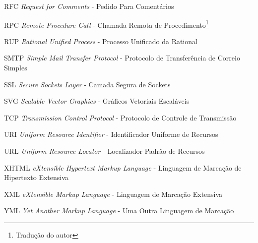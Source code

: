 \begin{siglas}
	\item[RFC] \textit{Request for Comments} - Pedido Para Comentários
	\item[RPC] \textit{Remote Procedure Call} - Chamada Remota de Procedimento\footnote{Tradução do autor}
	\item[RUP] \textit{Rational Unified Process} - Processo Unificado da Rational
	\item[SMTP] \textit{Simple Mail Transfer Protocol} - Protocolo de Transferência de Correio Simples
	\item[SSL] \textit{Secure Sockets Layer} - Camada Segura de Sockets
	\item[SVG] \textit{Scalable Vector Graphics} - Gráficos Vetoriais Escaláveis
	\item[TCP] \textit{Transmission Control Protocol} - Protocolo de Controle de Transmissão
	\item[URI] \textit{Uniform Resource Identifier} - Identificador Uniforme de Recursos
	\item[URL] \textit{Uniform Resource Locator} - Localizador Padrão de Recursos
	\item[XHTML] \textit{eXtensible Hypertext Markup Language} - Linguagem de Marcação de Hipertexto Extensiva
	\item[XML] \textit{eXtensible Markup Language} - Linguagem de Marcação Extensiva
	\item[YML] \textit{Yet Another Markup Language} - Uma Outra Linguagem de Marcação\footnotemark[2]
\end{siglas}

